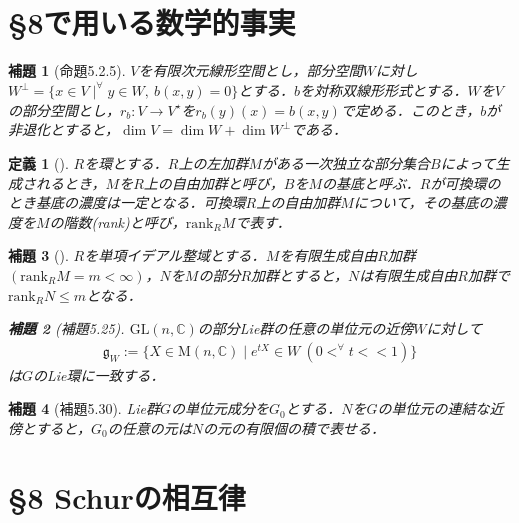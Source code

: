 \documentclass[dvipdfmx]{jsarticle}
\title{\empty}
\author{\empty}
\date{\today}
\newtheorem{definition}{定義}[section]%
\newtheorem{lemma}{補題}[section]
\begin{document}
%
%
%
%
\section*{\S 8で用いる数学的事実}
\begin{lemma}[\cite{sekai}命題5.2.5]
$V$を有限次元線形空間とし，部分空間$W$に対し$W^\perp=\{x\in V\mid ^\forall y\in W,{\ }b(x,y)=0\}$とする．$b$を対称双線形形式とする．$W$を$V$の部分空間とし，$r_b:V\to V^\star$を$r_b(y)(x)=b(x,y)$で定める．このとき，$b$が非退化とすると，$\dim{V}=\dim{W}+\dim{W^\perp}$である．
\end{lemma}
\begin{definition}[\cite{URL1}]
$R$を環とする．$R$上の左加群$M$がある一次独立な部分集合$B$によって生成されるとき，$M$を$R$上の自由加群と呼び，$B$を$M$の基底と呼ぶ．$R$が可換環のとき基底の濃度は一定となる．可換環$R$上の自由加群$M$について，その基底の濃度を$M$の階数(rank)と呼び，$\mathrm{rank}_R M$で表す．
\end{definition}
\begin{lemma}[\cite{URL2}]
$R$を単項イデアル整域とする．$M$を有限生成自由$R$加群$(\mathrm{rank}_{R}M=m<\infty)$，$N$を$M$の部分$R$加群とすると，$N$は有限生成自由$R$加群で$\mathrm{rank}_{R}N\leq m$となる．
\begin{lemma}[\cite{kobayashi}補題5.25]
$\mathrm{GL}(n,\mathbb{C})$の部分Lie群の任意の単位元の近傍$W$に対して
\begin{align*}
\mathfrak{g}_W:=\{X\in\mathrm{M}(n,\mathbb{C})\mid e^{tX}\in W{\ }(0< ^\forall t<<1)\}
\end{align*}
は$G$のLie環に一致する．
\end{lemma}
\end{lemma}
\begin{lemma}[\cite{kobayashi}補題5.30]
Lie群$G$の単位元成分を$G_0$とする．$N$を$G$の単位元の連結な近傍とすると，$G_0$の任意の元は$N$の元の有限個の積で表せる．
\end{lemma}
%
%
%
%
\section*{\S 8 Schurの相互律}
\setcounter{section}{8}
\end{document}
